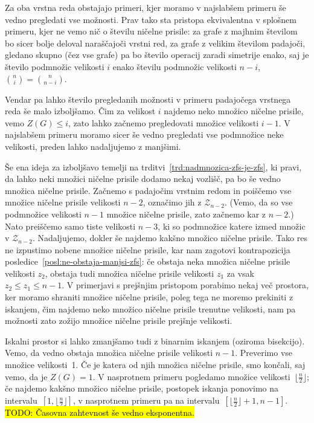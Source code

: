 \documentclass[12pt,a4paper,twoside]{article}
\theoremstyle{definition} %
\theoremstyle{plain} %
\numberwithin{equation}{section}  %
\begin{document}
Za oba vrstna reda obstajajo primeri, kjer moramo v najslabšem primeru še vedno pregledati vse možnosti. Prav tako sta pristopa ekvivalentna v splošnem primeru, kjer ne vemo nič o številu ničelne prisile: za grafe z majhnim številom bo sicer bolje deloval naraščajoči vrstni red, za grafe z velikim številom padajoči, gledano skupno (čez vse grafe) pa bo število operacij zaradi simetrije enako, saj je število podmnožic velikosti $i$ enako številu podmnožic velikosti $n-i$, $\binom{n}{i} = \binom{n}{n-i}$.

Vendar pa lahko število pregledanih možnosti v primeru padajočega vrstnega reda še malo izboljšamo. Čim za velikost $i$ najdemo neko množico ničelne prisile, vemo $Z(G) \leq i$, zato lahko začnemo pregledovati množice velikosti $i-1$. V najslabšem primeru moramo sicer še vedno pregledati vse podmnožice neke velikosti, preden lahko nadaljujemo z manjšimi.

Še ena ideja za izboljšavo temelji na trditvi~\ref{trd:nadmnozica-zfs-je-zfs}, ki pravi, da lahko neki množici ničelne prisile dodamo nekaj vozlišč, pa bo še vedno množica ničelne prisile. Začnemo s padajočim vrstnim redom in poiščemo vse množice ničelne prisile velikosti $n-2$, označimo jih z $\mathcal{Z}_{n-2}$. (Vemo, da so vse podmnožice velikosti $n-1$ množice ničelne prisile, zato začnemo kar z $n-2$.) Nato preiščemo samo tiste velikosti $n-3$, ki so podmnožice katere izmed množic v $\mathcal{Z}_{n-2}$. Nadaljujemo, dokler še najdemo kakšno množico ničelne prisile.
Tako res ne izpustimo nobene množice ničelne prisile, kar nam zagotovi kontrapozicija posledice~\ref{posl:ne-obstaja-manjsi-zfs}: če obstaja neka množica ničelne prisile velikosti $z_2$, obstaja tudi množica ničelne prisile velikosti $z_1$ za vsak $z_2 \leq z_1 \leq n-1$.
V primerjavi s prejšnjim pristopom porabimo nekaj več prostora, ker moramo shraniti množice ničelne prisile, poleg tega ne moremo prekiniti z iskanjem, čim najdemo neko množico ničelne prisile trenutne velikosti, nam pa možnosti zato zožijo množice ničelne prisile prejšnje velikosti.

Iskalni prostor si lahko zmanjšamo tudi z binarnim iskanjem (oziroma bisekcijo). Vemo, da vedno obstaja množica ničelne prisile velikosti $n-1$. Preverimo vse množice velikosti~1. Če je katera od njih množica ničelne prisile, smo končali, saj vemo, da je $Z(G) = 1$. V nasprotnem primeru pogledamo množice velikosti~$\lfloor \frac{n}{2} \rfloor$; če najdemo kakšno množico ničelne prisile, postopek iskanja ponovimo na intervalu~$[1,\lfloor \frac{n}{2} \rfloor]$, v nasprotnem primeru pa na intervalu~$[\lfloor \frac{n}{2} \rfloor + 1, n-1]$. \hl{TODO: Časovna zahtevnost še vedno eksponentna.}
\end{document}
